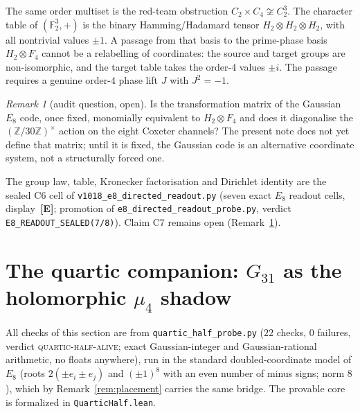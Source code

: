\documentclass[11pt,a4paper]{article}
\theoremstyle{remark}
\newtheorem{remark}[theorem]{Remark}
\newcommand{\F}{\mathbb F}
\newcommand{\Z}{\mathbb Z}
\providecommand{\veri}[1]{\texttt{#1}}
\begin{document}
The same order multiset is the red-team obstruction
$C_2\times C_4\not\cong C_2^3$.  The character table of
$(\F_2^3,+)$ is the binary Hamming/Hadamard tensor
$H_2\otimes H_2\otimes H_2$, with all nontrivial values $\pm1$.  A
passage from that basis to the prime-phase basis $H_2\otimes F_4$
cannot be a relabelling of coordinates: the source and target groups
are non-isomorphic, and the target table takes the order-$4$ values
$\pm i$.  The passage requires a genuine order-$4$ phase lift $J$
with $J^2=-1$.

\begin{remark}[audit question, open]
\label{rem:c7-audit}
Is the transformation matrix of the Gaussian $E_8$ code, once
fixed, monomially equivalent to $H_2\otimes F_4$ and does it
diagonalise the $(\Z/30\Z)^{\times}$ action on the eight Coxeter
channels?  The present note does not yet define that matrix;
until it is fixed, the Gaussian code is an alternative coordinate
system, not a structurally forced one.
\end{remark}

The group law, table, Kronecker factorisation and Dirichlet identity
are the sealed C6 cell of
\veri{v1018\_e8\_directed\_readout.py}
(seven exact $E_8$ readout cells, display~\textbf{[E]}; promotion of
\texttt{e8\_directed\_readout\_probe.py}, verdict
\texttt{E8\_READOUT\_SEALED(7/8)}).
Claim C7 remains open (Remark~\ref{rem:c7-audit}).

\section{The quartic companion:
\texorpdfstring{$G_{31}$}{G31} as the holomorphic
\texorpdfstring{$\mu_4$}{mu4} shadow}\label{sec:quartic}

All checks of this section are from \texttt{quartic\_half\_probe.py}
($22$ checks, $0$ failures, verdict \textsc{quartic-half-alive};
exact Gaussian-integer and Gaussian-rational arithmetic, no floats
anywhere), run in the standard doubled-coordinate model of $E_8$
(roots $2(\pm e_i\pm e_j)$ and $(\pm1)^8$ with an even number of
minus signs; norm $8$), which by Remark~\ref{rem:placement} carries
the same bridge.  The provable core is formalized in
\texttt{QuarticHalf.lean}.
\end{document}
